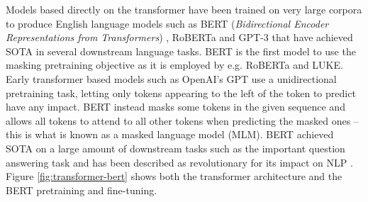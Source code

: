 \documentclass[main.tex]{subfiles}
\begin{document}
Models based directly on the transformer have been trained on very large corpora to produce English language models such as BERT (\emph{Bidirectional Encoder Representations from Transformers}) \cite{devlin2019bert}, RoBERTa \cite{liu2019roberta} and GPT-3 \cite{brown2020language} that have achieved SOTA in several downstream language tasks.
BERT is the first model to use the masking pretraining objective as it is employed by e.g. RoBERTa and LUKE.
Early transformer based models such as OpenAI's GPT \cite{rashford2018gpt} use a unidirectional pretraining task, letting only tokens appearing to the left of the token to predict have any impact.
BERT instead masks some tokens in the given sequence and allows all tokens to attend to all other tokens when predicting the masked ones -- this is what is known as a masked language model (MLM).
BERT achieved SOTA on a large amount of downstream tasks such as the important question answering task and has been described as revolutionary for its impact on NLP \cite{raj2019bert}.
Figure \ref{fig:transformer-bert} shows both the transformer architecture and the BERT pretraining and fine-tuning.
\end{document}
